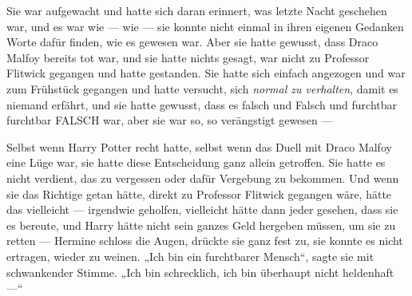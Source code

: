 Sie war aufgewacht und hatte sich daran erinnert, was letzte Nacht geschehen war, und es war wie — wie — sie konnte nicht einmal in ihren eigenen Gedanken Worte dafür finden, wie es gewesen war. Aber sie hatte gewusst, dass Draco Malfoy bereits tot war, und sie hatte nichts gesagt, war nicht zu Professor Flitwick gegangen und hatte gestanden. Sie hatte sich einfach angezogen und war zum Frühstück gegangen und hatte versucht, sich \emph{normal zu verhalten}, damit es niemand erfährt, und sie hatte gewusst, dass es falsch und Falsch und furchtbar furchtbar FALSCH war, aber sie war so, so verängstigt gewesen —



Selbst wenn Harry Potter recht hatte, selbst wenn das Duell mit Draco Malfoy eine Lüge war, sie hatte diese Entscheidung ganz allein getroffen. Sie hatte es nicht verdient, das zu vergessen oder dafür Vergebung zu bekommen. Und wenn sie das Richtige getan hätte, direkt zu Professor Flitwick gegangen wäre, hätte das vielleicht — irgendwie geholfen, vielleicht hätte dann jeder gesehen, dass sie es bereute, und Harry hätte nicht sein ganzes Geld hergeben müssen, um sie zu retten — Hermine schloss die Augen, drückte sie ganz fest zu, sie konnte es nicht ertragen, wieder zu weinen.
„Ich bin ein furchtbarer Mensch“, sagte sie mit schwankender Stimme.
„Ich bin schrecklich, ich bin überhaupt nicht heldenhaft —“

